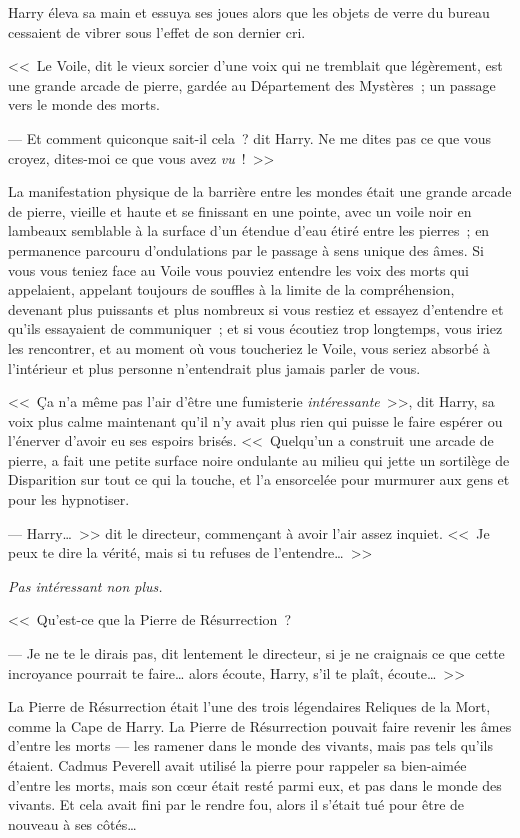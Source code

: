 Harry éleva sa main et essuya ses joues alors que les objets de verre du bureau cessaient de vibrer sous l'effet de son dernier cri.

<<~Le Voile, dit le vieux sorcier d'une voix qui ne tremblait que légèrement, est une grande arcade de pierre, gardée au Département des Mystères~; un passage vers le monde des morts.

--- Et comment quiconque sait-il cela~? dit Harry. Ne me dites pas ce que vous croyez, dites-moi ce que vous avez \emph{vu}~!~>>

La manifestation physique de la barrière entre les mondes était une grande arcade de pierre, vieille et haute et se finissant en une pointe, avec un voile noir en lambeaux semblable à la surface d'un étendue d'eau étiré entre les pierres~; en permanence parcouru d'ondulations par le passage à sens unique des âmes. Si vous vous teniez face au Voile vous pouviez entendre les voix des morts qui appelaient, appelant toujours de souffles à la limite de la compréhension, devenant plus puissants et plus nombreux si vous restiez et essayez d'entendre et qu'ils essayaient de communiquer~; et si vous écoutiez trop longtemps, vous iriez les rencontrer, et au moment où vous toucheriez le Voile, vous seriez absorbé à l'intérieur et plus personne n'entendrait plus jamais parler de vous.

<<~Ça n'a même pas l'air d'être une fumisterie \emph{intéressante}~>>, dit Harry, sa voix plus calme maintenant qu'il n'y avait plus rien qui puisse le faire espérer ou l'énerver d'avoir eu ses espoirs brisés. <<~Quelqu'un a construit une arcade de pierre, a fait une petite surface noire ondulante au milieu qui jette un sortilège de Disparition sur tout ce qui la touche, et l'a ensorcelée pour murmurer aux gens et pour les hypnotiser.

--- Harry…~>> dit le directeur, commençant à avoir l'air assez inquiet. <<~Je peux te dire la vérité, mais si tu refuses de l'entendre…~>>

\emph{Pas intéressant non plus.}

<<~Qu'est-ce que la Pierre de Résurrection~?

--- Je ne te le dirais pas, dit lentement le directeur, si je ne craignais ce que cette incroyance pourrait te faire… alors écoute, Harry, s'il te plaît, écoute…~>>

La Pierre de Résurrection était l'une des trois légendaires Reliques de la Mort, comme la Cape de Harry. La Pierre de Résurrection pouvait faire revenir les âmes d'entre les morts — les ramener dans le monde des vivants, mais pas tels qu'ils étaient. Cadmus Peverell avait utilisé la pierre pour rappeler sa bien-aimée d'entre les morts, mais son cœur était resté parmi eux, et pas dans le monde des vivants. Et cela avait fini par le rendre fou, alors il s'était tué pour être de nouveau à ses côtés…

